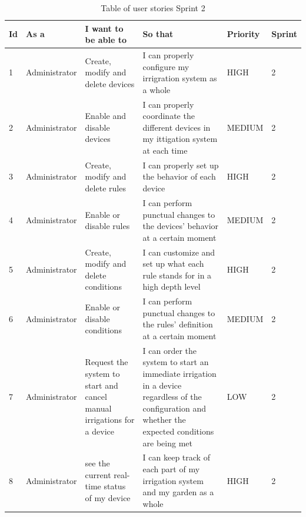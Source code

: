 \documentclass[11pt,a4paper]{article}
\begin{document}
\begin{table}[htbp]
\centering
\begin{adjustbox}{angle=90,width=4.5in}
\begin{tabular}{|l|l|l|p{6cm}|l|l|}
\hline
\textbf{Id} & \textbf{As a} & \textbf{I want to be able to} & \textbf{So that} & \textbf{Priority} & \textbf{Sprint} \\
\hline \hline
1 & Administrator & Create, modify and delete devices & I can properly configure my irrigration system as a whole & HIGH & 2 \\
\hline 
2 & Administrator & Enable and disable devices & I can properly coordinate the different devices in my ittigation system at each time & MEDIUM & 2 \\
\hline
3 & Administrator & Create, modify and delete rules & I can properly set up the behavior of each device & HIGH & 2 \\
\hline
4 & Administrator & Enable or disable rules & I can perform punctual changes to the devices’ behavior at a certain moment & MEDIUM & 2 \\
\hline
5 & Administrator & Create, modify and delete conditions & I can customize and set up what each rule stands for in a high depth level & HIGH & 2 \\
\hline
6 & Administrator &  Enable or disable conditions & I can perform punctual changes to the rules’ definition at a certain moment & MEDIUM & 2 \\
\hline
7 & Administrator & Request the system to start and cancel manual irrigations for a device & I can order the system to start an immediate irrigation in a device regardless of the configuration and whether the expected conditions are being met & LOW & 2 \\
\hline
8 & Administrator & see the current real-time status of my device & I can keep track of each part of my irrigation system and my garden as a whole & HIGH & 2 \\
\hline
\end{tabular}
\end{adjustbox}
\caption{Table of user stories Sprint 2}
\end{table}

\newpage
\end{document}
